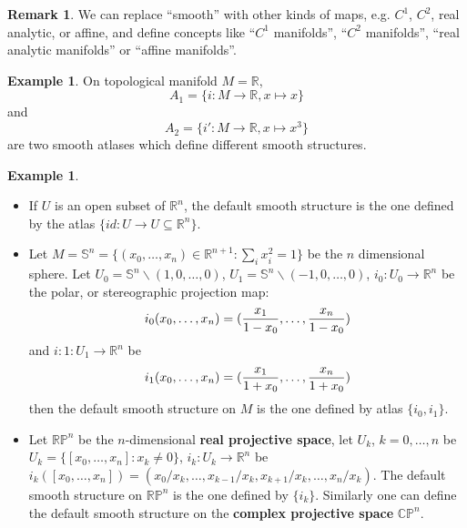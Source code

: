 \documentclass{article}
\theoremstyle{definition}
\newtheorem{rmk}[thm]{Remark}
\newtheorem{exm}[thm]{Example}
\begin{document}
\begin{rmk}
    We can replace ``smooth'' with other kinds of maps, e.g. $C^1$, $C^2$, real analytic, or affine, and define concepts like ``$C^1$ manifolds'', ``$C^2$ manifolds'', ``real analytic manifolds'' or ``affine manifolds''.
\end{rmk}

\begin{exm}
    On topological manifold $M=\mathbb{R}$, 
    \[A_1=\{i: M\rightarrow\mathbb{R}, x\mapsto x\}\]
    and
    \[A_2=\{i': M\rightarrow \mathbb{R}, x\mapsto x^3\}\]
    are two smooth atlases which define different smooth structures.
\end{exm}

\begin{exm}
\begin{itemize}
    \item If $U$ is an open subset of $\mathbb{R}^n$, the default smooth structure is the one defined by the atlas $\{id: U\rightarrow U\subseteq\mathbb{R}^n\}$.
    \item Let $M=\mathbb{S}^n=\{(x_0, \dots, x_n)\in\mathbb{R}^{n+1}: \sum_ix_i^2=1\}$ be the $n$ dimensional sphere. Let $U_0=\mathbb{S}^n\backslash (1, 0, \dots, 0)$, $U_1=\mathbb{S}^n\backslash (-1, 0, \dots, 0)$, $i_0: U_0\rightarrow\mathbb{R}^n$ be the polar, or stereographic projection map: 
    \[i_0(x_0, \dots, x_n)=({x_1\over 1-x_0}, \dots, {x_n\over 1-x_0})\]
    and $i:1: U_1\rightarrow\mathbb{R}^n$ be 
    \[i_1(x_0, \dots, x_n)=({x_1\over 1+x_0}, \dots, {x_n\over 1+x_0})\]
    then the default smooth structure on $M$ is the one defined by atlas $\{i_0, i_1\}$.
    \item Let $\mathbb{RP}^n$ be the $n$-dimensional {\bf real projective space}, let $U_k$, $k=0, \dots, n$ be $U_k=\{[x_0, \dots, x_n]: x_k\not=0\}$, $i_k: U_k\rightarrow \mathbb{R}^n$ be $i_k([x_0, \dots, x_n])=(x_0/x_k,\dots, x_{k-1}/x_k, x_{k+1}/x_k, \dots, x_n/x_k)$. The default smooth structure on $\mathbb{RP}^n$ is the one defined by $\{i_k\}$. Similarly one can define the default smooth structure on the {\bf complex projective space} $\mathbb{CP}^n$.
\end{itemize}
\end{exm}
\end{document}

